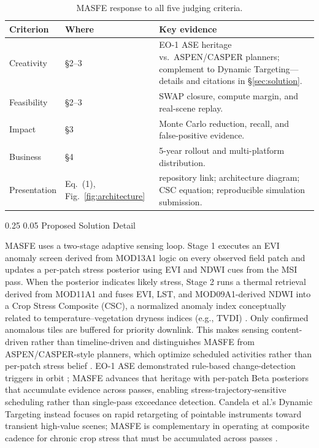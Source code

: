 \documentclass[11pt,letterpaper]{article}
\makeatletter
\renewcommand\section{\@startsection{section}{1}{\z@}
  {0.25\baselineskip}
  {0.05\baselineskip}
  {\normalfont\large\bfseries}}
\renewcommand{\arraystretch}{1.08}
\makeatother
\begin{document}
\begin{table}[H]
\centering
\caption{MASFE response to all five judging criteria.}
\label{tab:criteria-summary}
\begingroup
\small
\setlength{\tabcolsep}{5pt}
\renewcommand{\arraystretch}{1.1}
\begin{tabularx}{\linewidth}{p{2.2cm}p{3cm}X}
\toprule
\textbf{Criterion} & \textbf{Where} & \textbf{Key evidence} \\
\midrule
Creativity & \S2--3 & EO-1 ASE heritage vs.\ ASPEN/CASPER planners; complement to Dynamic Targeting---details and citations in \S\ref{sec:solution}. \\
Feasibility & \S2--3 & SWAP closure, compute margin, and real-scene replay. \\
Impact & \S3 & Monte Carlo reduction, recall, and false-positive evidence. \\
Business & \S4 & 5-year rollout and multi-platform distribution. \\
Presentation & Eq.~(1), Fig.~\ref{fig:architecture} & repository link; architecture diagram; CSC equation; reproducible simulation submission. \\
\bottomrule
\end{tabularx}
\endgroup
\end{table}

\section{Proposed Solution Detail}
\label{sec:solution}

MASFE uses a two-stage adaptive sensing loop. Stage 1 executes an EVI anomaly screen derived from MOD13A1 logic on every observed field patch and updates a per-patch stress posterior using EVI and NDWI cues from the MSI pass. When the posterior indicates likely stress, Stage 2 runs a thermal retrieval derived from MOD11A1 and fuses EVI, LST, and MOD09A1-derived NDWI into a Crop Stress Composite (CSC), a normalized anomaly index conceptually related to temperature--vegetation dryness indices (e.g., TVDI) \cite{mod13a1,mod11a1,mod09a1,mod09-guide}. Only confirmed anomalous tiles are buffered for priority downlink. This makes sensing content-driven rather than timeline-driven and distinguishes MASFE from ASPEN/CASPER-style planners, which optimize scheduled activities rather than per-patch stress belief \cite{aspen-spaceops,eo1-casper-autonomous-science}. EO-1 ASE demonstrated rule-based change-detection triggers in orbit \cite{eo1-autonomy}; MASFE advances that heritage with per-patch Beta posteriors that accumulate evidence across passes, enabling stress-trajectory-sensitive scheduling rather than single-pass exceedance detection. Candela et al.'s Dynamic Targeting instead focuses on rapid retargeting of pointable instruments toward transient high-value scenes; MASFE is complementary in operating at composite cadence for chronic crop stress that must be accumulated across passes \cite{dynamic-targeting}.
\end{document}
